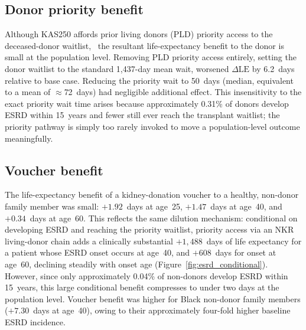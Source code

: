 \subsection{Donor priority benefit}
Although KAS250 affords prior living donors (PLD) priority access to the deceased-donor waitlist,~\cite{wainright_impact_2017} the resultant life-expectancy benefit to the donor is small at the population level. Removing PLD priority access entirely, setting the donor waitlist to the standard 1{,}437-day mean wait, worsened $\Delta\text{LE}$ by 6.2~days relative to base case. Reducing the priority wait to 50~days (median, equivalent to a mean of $\approx$72~days) had negligible additional effect. This insensitivity to the exact priority wait time arises because approximately 0.31\% of donors develop ESRD within 15~years and fewer still ever reach the transplant waitlist; the priority pathway is simply too rarely invoked to move a population-level outcome meaningfully.

\subsection{Voucher benefit}
The life-expectancy benefit of a kidney-donation voucher to a healthy, non-donor family member was small: $+1.92$~days at age~25, $+1.47$~days at age~40, and $+0.34$~days at age~60. This reflects the same dilution mechanism: conditional on developing ESRD and reaching the priority waitlist, priority access via an NKR living-donor chain adds a clinically substantial $+1{,}488$~days of life expectancy for a patient whose ESRD onset occurs at age~40, and $+608$~days for onset at age~60, declining steadily with onset age (Figure~\ref{fig:esrd_conditional}). However, since only approximately 0.04\% of non-donors develop ESRD within 15~years, this large conditional benefit compresses to under two days at the population level. Voucher benefit was higher for Black non-donor family members ($+7.30$~days at age~40), owing to their approximately four-fold higher baseline ESRD incidence.~\cite{grams_kidney-failure_2016}
